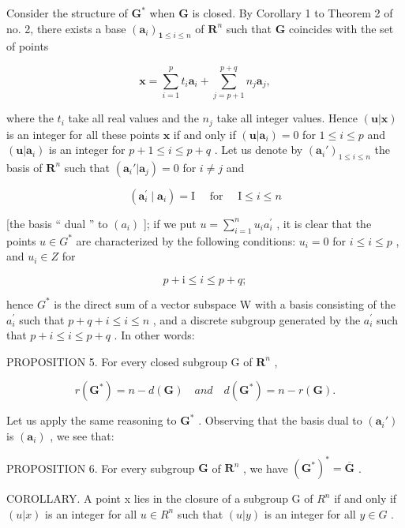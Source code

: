 Consider the structure of \(\mathbf{G}^*\) when \(\mathbf{G}\) is closed. By Corollary 1 to Theorem 2 of no. 2, there exists a base \((\pmb{a}_i)_{\mathbf{1} \leqslant i \leqslant n}\) of \(\mathbf{R}^n\) such that \(\mathbf{G}\) coincides with the set of points

\[
\boldsymbol {x} = \sum_ {i = 1} ^ {p} t _ {i} \boldsymbol {a} _ {i} + \sum_ {j = p + 1} ^ {p + q} n _ {j} \boldsymbol {a} _ {j},
\]

where the \(t_i\) take all real values and the \(n_j\) take all integer values. Hence \((\boldsymbol{u}|\boldsymbol{x})\) is an integer for all these points \(\boldsymbol{x}\) if and only if \((\boldsymbol{u}|\boldsymbol{a}_i) = 0\) for \(1 \leqslant i \leqslant p\) and \((\boldsymbol{u}|\boldsymbol{a}_i)\) is an integer for \(p + 1 \leqslant i \leqslant p + q\) . Let us denote by \((\boldsymbol{a}_i')_{1 \leqslant i \leqslant n}\) the basis of \(\mathbf{R}^n\) such that \((\boldsymbol{a}_i'|\boldsymbol{a}_j) = 0\) for \(i \neq j\) and

\[
\left(\boldsymbol {a} _ {i} ^ {\prime} \mid \boldsymbol {a} _ {i}\right) = \mathrm{I} \quad \text { for } \quad \mathrm{I} \leqslant i \leqslant n
\]

{[}the basis `` dual '' to \((a_{i})\) {]}; if we put \(u = \sum_{i=1}^{n} u_{i} a_{i}^{\prime}\) , it is clear that the points \(u \in G^{*}\) are characterized by the following conditions: \(u_{i} = 0\) for \(i \leqslant i \leqslant p\) , and \(u_{i} \in Z\) for

\[
p + \mathrm{i} \leqslant i \leqslant p + q;
\]

hence \(G^{*}\) is the direct sum of a vector subspace W with a basis consisting of the \(a_{i}^{\prime}\) such that \(p + q + i \leqslant i \leqslant n\) , and a discrete subgroup generated by the \(a_{i}^{\prime}\) such that \(p + i \leqslant i \leqslant p + q\) . In other words:

PROPOSITION 5. For every closed subgroup G of \(\mathbf{R}^n\) ,

\[
r (\mathbf {G} ^ {*}) = n - d (\mathbf {G}) \quad a n d \quad d (\mathbf {G} ^ {*}) = n - r (\mathbf {G}).
\]

Let us apply the same reasoning to \(\mathbf{G}^*\) . Observing that the basis dual to \((\pmb{a}_i')\) is \((\pmb{a}_i)\) , we see that:

PROPOSITION 6. For every subgroup \(\mathbf{G}\) of \(\mathbf{R}^n\) , we have \((\mathbf{G}^*)^* = \overline{\mathbf{G}}\) .

COROLLARY. A point x lies in the closure of a subgroup G of \(R^{n}\) if and only if \((u|x)\) is an integer for all \(u \in R^{n}\) such that \((u|y)\) is an integer for all \(y \in G\) .

